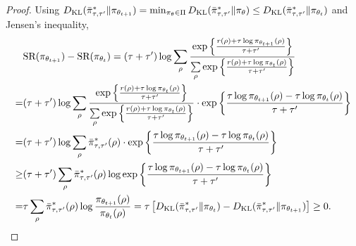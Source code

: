 \documentclass{article} %
\begin{document}
\begin{proof}
Using $D_{\mathrm{KL}}(\bar{\pi}_{\tau,\tau^{\prime}}^* \| \pi_{\theta_{t+1}}) = \min_{\pi_\theta \in \Pi}{ D_{\mathrm{KL}}(\bar{\pi}_{\tau,\tau^{\prime}}^* \| \pi_\theta)} \le D_{\mathrm{KL}}(\bar{\pi}_{\tau,\tau^{\prime}}^* \| \pi_{\theta_t})$ and Jensen's inequality,
\begin{equation*}
\begin{split}
	&\text{SR}(\pi_{\theta_{t+1}}) - \text{SR}(\pi_{\theta_t}) = (\tau + \tau^{\prime}) \log{ \sum\limits_{\rho}{ \frac{  \exp\left\{ \frac{r(\rho) + \tau \log{\pi_{\theta_{t+1}}(\rho)} }{\tau + \tau^{\prime}} \right\}  }{ \sum\limits_{\rho}{  \exp\left\{ \frac{r(\rho) + \tau \log{\pi_{\theta_t}(\rho)} }{\tau + \tau^{\prime}} \right\} } }  } } \\
	=& (\tau + \tau^{\prime}) \log{ \sum\limits_{\rho}{ \frac{  \exp\left\{ \frac{r(\rho) + \tau \log{\pi_{\theta_t}(\rho)} }{\tau + \tau^{\prime}} \right\}  }{ \sum\limits_{\rho}{  \exp\left\{ \frac{r(\rho) + \tau \log{\pi_{\theta_t}(\rho)} }{\tau + \tau^{\prime}} \right\} } }  } \cdot \exp\left\{ \frac{\tau \log{\pi_{\theta_{t+1}}(\rho)} - \tau \log{\pi_{\theta_t}(\rho)} }{\tau + \tau^{\prime}} \right\} } \\
	=& (\tau + \tau^{\prime}) \log{ \sum\limits_{\rho}{ \bar{\pi}_{\tau,\tau^{\prime}}^*(\rho) } \cdot \exp\left\{ \frac{\tau \log{\pi_{\theta_{t+1}}(\rho)} - \tau \log{\pi_{\theta_t}(\rho)} }{\tau + \tau^{\prime}} \right\} } \\
	\ge& (\tau + \tau^{\prime}) \sum\limits_{\rho}{ \bar{\pi}_{\tau,\tau^{\prime}}^*(\rho) \log{ \exp\left\{ \frac{\tau \log{\pi_{\theta_{t+1}}(\rho)} - \tau \log{\pi_{\theta_t}(\rho)} }{\tau + \tau^{\prime}} \right\} } } \\
	=& \tau \sum\limits_{\rho}{ \bar{\pi}_{\tau,\tau^{\prime}}^*(\rho) \log{ \frac{\pi_{\theta_{t+1}}(\rho)}{\pi_{\theta_t}(\rho)} } } = \tau \left[ D_{\mathrm{KL}}(\bar{\pi}_{\tau,\tau^{\prime}}^* \| \pi_{\theta_t}) - D_{\mathrm{KL}}(\bar{\pi}_{\tau,\tau^{\prime}}^* \| \pi_{\theta_{t+1}})\right] \ge 0. \qedhere
\end{split}
\end{equation*}
\end{proof}
\end{document}
